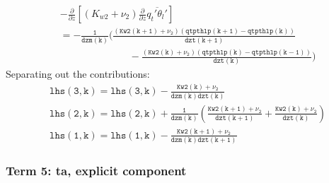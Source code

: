 \documentclass[11pt,fleqn]{article}
\newcommand{\ptlder}[2]{\frac{\partial #1}{\partial #2}}
\begin{document}
\begin{equation}
\begin{split}
& - \ptlder{}{z} \left[ \left( K_{w2} + \nu_2 \right)
                        \ptlder{}{z} \overline{q_t'\theta_l'}
                 \right]  \\
 &= \mathtt{
    -\frac{1}{dzm(k)}
     \bigg( \frac{ \left( Kw2(k+1) + \nu_2 \right)
                   \left( qtpthlp(k+1) - qtpthlp(k) \right)} {dzt(k+1)}  }  \\
 &  \mathtt{ \qquad \qquad \qquad \quad
           -\frac{ \left( Kw2(k) + \nu_2 \right)
                   \left( qtpthlp(k) - qtpthlp(k-1) \right)} {dzt(k)}
     \bigg)
    }
\end{split}
\end{equation}
%
Separating out the contributions:
%
\begin{equation}
\begin{split}
&\mathtt{lhs(3,k) = lhs(3,k) - \frac{Kw2(k)+\nu_2}{dzm(k)dzt(k)} } \\
&\mathtt{lhs(2,k) = lhs(2,k) + \frac{1}{dzm(k)}
                               \left(   \frac{Kw2(k+1)+\nu_2}{dzt(k+1)} 
                                      + \frac{Kw2(k)+\nu_2}{dzt(k)} \right) } \\
&\mathtt{lhs(1,k) = lhs(1,k) - \frac{Kw2(k+1)+\nu_2}{dzm(k)dzt(k+1)} }
\end{split}
\end{equation}

\subsubsection{Term 5:  ta, explicit component}
\end{document}
